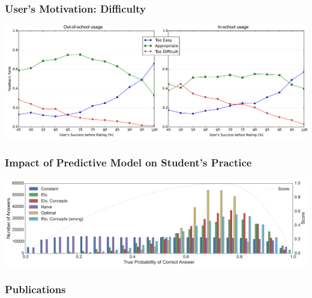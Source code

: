 \documentclass[xcolor=svgnames]{beamer}
\begin{document}
\begin{frame}
	\frametitle{User's Motivation: Difficulty}
	\begin{center}
		\includegraphics[width=\textwidth]{feedback}
	\end{center}
\end{frame}
\begin{frame}
	\frametitle{Impact of Predictive Model on Student's Practice}
	\begin{center}
		\includegraphics[width=\textwidth]{number_of_answers}
	\end{center}
\end{frame}
\begin{frame}
	\frametitle{Publications}
	
	\nocite{*}
	
\end{frame}
\end{document}
